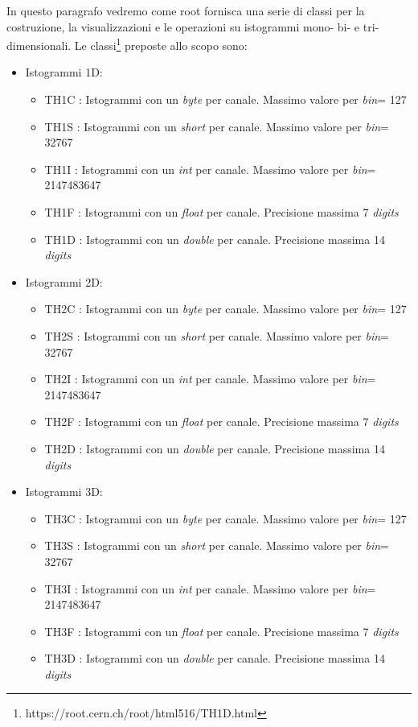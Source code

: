 \documentclass[11pt,fleqn]{book} %
\begin{document}
In questo paragrafo vedremo come root fornisca una serie di classi per la costruzione, la visualizzazioni e  le operazioni su istogrammi mono- bi- e tri- dimensionali.
Le classi\footnote{https://root.cern.ch/root/html516/TH1D.html} preposte allo scopo sono:
\begin{itemize}
\item Istogrammi 1D:
\begin{itemize}
\item TH1C : Istogrammi con un \textit{byte} per canale. Massimo valore per \textit{bin}= 127
\item    TH1S : Istogrammi con un \textit{short} per canale. Massimo valore per \textit{bin}=  32767
\item    TH1I : Istogrammi con un \textit{int} per canale. Massimo valore per \textit{bin}=  2147483647
\item    TH1F : Istogrammi con un \textit{float} per canale. Precisione massima 7 \textit{digits}
\item    TH1D : Istogrammi con un \textit{double} per canale. Precisione massima 14 \textit{digits} 
\end{itemize}
\item Istogrammi 2D:
\begin{itemize}
\item     TH2C : Istogrammi con un  \textit{byte} per canale. Massimo valore per \textit{bin}=  127
\item     TH2S : Istogrammi con un  \textit{short} per canale. Massimo valore per \textit{bin}=  32767
\item     TH2I : Istogrammi con un  \textit{int} per canale. Massimo valore per \textit{bin}=  2147483647
\item     TH2F : Istogrammi con un  \textit{float} per canale. Precisione massima 7 \textit{digits}
\item     TH2D : Istogrammi con un  \textit{double} per canale. Precisione massima 14 \textit{digits} 
\end{itemize}

\item Istogrammi 3D:
\begin{itemize}
\item     TH3C : Istogrammi con un  \textit{byte} per canale. Massimo valore per \textit{bin}=  127
\item     TH3S : Istogrammi con un  \textit{short} per canale. Massimo valore per \textit{bin}=  32767
\item     TH3I : Istogrammi con un  \textit{int} per canale. Massimo valore per \textit{bin}=  2147483647
\item     TH3F : Istogrammi con un  \textit{float} per canale. Precisione massima 7 \textit{digits}
\item     TH3D : Istogrammi con un  \textit{double} per canale. Precisione massima 14 \textit{digits} 
    \end{itemize}
\end{itemize}
\end{document}
